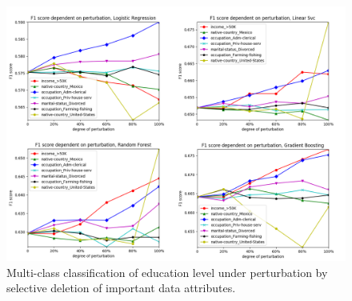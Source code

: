 \documentclass{llncs}
\begin{document}




\begin{figure}[!h]
	\centering
	\includegraphics[width=1\textwidth]{figures/perturbation/adults_education_num/perturb_education_combined}
	\caption{Multi-class classification of education level under perturbation by selective deletion of important data attributes.}
	\label{fig:results_perturbation_education_num}
\end{figure}
\end{document}

